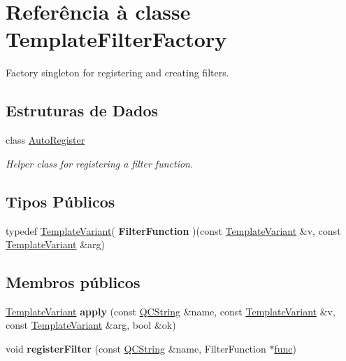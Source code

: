 \hypertarget{class_template_filter_factory}{\section{Referência à classe Template\-Filter\-Factory}
\label{class_template_filter_factory}
}


Factory singleton for registering and creating filters.  


\subsection*{Estruturas de Dados}
\begin{DoxyCompactItemize}
\item 
class \hyperlink{class_template_filter_factory_1_1_auto_register}{Auto\-Register}
\begin{DoxyCompactList}\small\item\em Helper class for registering a filter function. \end{DoxyCompactList}\end{DoxyCompactItemize}
\subsection*{Tipos Públicos}
\begin{DoxyCompactItemize}
\item 
\hypertarget{class_template_filter_factory_a4943caeb77ca6786c66f9f21ca0b90da}{typedef \hyperlink{class_template_variant}{Template\-Variant}( {\bfseries Filter\-Function} )(const \hyperlink{class_template_variant}{Template\-Variant} \&v, const \hyperlink{class_template_variant}{Template\-Variant} \&arg)}\label{class_template_filter_factory_a4943caeb77ca6786c66f9f21ca0b90da}

\end{DoxyCompactItemize}
\subsection*{Membros públicos}
\begin{DoxyCompactItemize}
\item 
\hypertarget{class_template_filter_factory_a4736b60401211b747432c6e9c39abef9}{\hyperlink{class_template_variant}{Template\-Variant} {\bfseries apply} (const \hyperlink{class_q_c_string}{Q\-C\-String} \&name, const \hyperlink{class_template_variant}{Template\-Variant} \&v, const \hyperlink{class_template_variant}{Template\-Variant} \&arg, bool \&ok)}\label{class_template_filter_factory_a4736b60401211b747432c6e9c39abef9}

\item 
\hypertarget{class_template_filter_factory_ae6c0d1638b3f14f7d37c60a410fcf0be}{void {\bfseries register\-Filter} (const \hyperlink{class_q_c_string}{Q\-C\-String} \&name, Filter\-Function $\ast$\hyperlink{036__link_8c_affb6da6cff1b57cdf8efc0123dceac9b}{func})}\label{class_template_filter_factory_ae6c0d1638b3f14f7d37c60a410fcf0be}

\end{DoxyCompactItemize}
